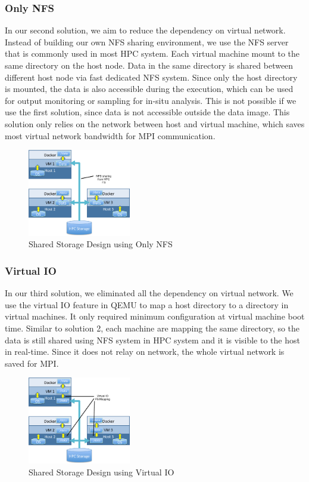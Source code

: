 \subsubsection{Only NFS}
In our second solution, we aim to reduce the dependency on virtual network. Instead of building our own NFS sharing environment, we use the NFS server that is commonly used in most HPC system. Each virtual machine mount to the same directory on the host node. Data in the same directory is shared between different host node via fast dedicated NFS system. Since only the host directory is mounted, the data is also accessible during the execution, which can be used for output monitoring or sampling for in-situ analysis. This is not possible if we use the first solution, since data is not accessible outside the data image. This solution only relies on the network between host and virtual machine, which saves most virtual network bandwidth for MPI communication.
\begin{figure}[h]
    \centering
    \caption{Shared Storage Design using Only NFS}
    \label{fs2}
    \includegraphics[width=0.4\textwidth]{figures/fs2.pdf}
\end{figure}
\subsubsection{Virtual IO}
In our third solution, we eliminated all the dependency on virtual network. We use the virtual IO \cite{russell2008virtio} feature in QEMU to map a host directory to a directory in virtual machines. It only required minimum configuration at virtual machine boot time. Similar to solution 2, each machine are mapping the same directory, so the data is still shared using NFS system in HPC system and it is visible to the host in real-time. Since it does not relay on network, the whole virtual network is saved for MPI.
\begin{figure}[h]
    \centering
    \caption{Shared Storage Design using Virtual IO}
    \label{fs3}
    \includegraphics[width=0.4\textwidth]{figures/fs3.pdf}
\end{figure}
